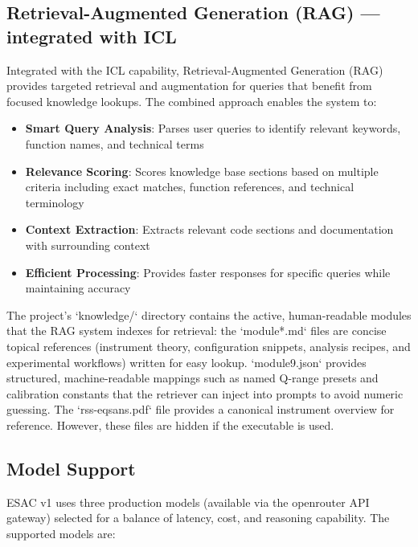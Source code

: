 \documentclass[tm]{ornltm} %
\begin{document}
\subsection{Retrieval-Augmented Generation (RAG) — integrated with ICL}
\label{subsec:rag_mode}

Integrated with the ICL capability, Retrieval-Augmented Generation (RAG) provides targeted retrieval and augmentation for queries that benefit from focused knowledge lookups. The combined approach enables the system to:

\begin{itemize}
  \item \textbf{Smart Query Analysis}: Parses user queries to identify relevant keywords, function names, and technical terms
  \item \textbf{Relevance Scoring}: Scores knowledge base sections based on multiple criteria including exact matches, function references, and technical terminology
  \item \textbf{Context Extraction}: Extracts relevant code sections and documentation with surrounding context
  \item \textbf{Efficient Processing}: Provides faster responses for specific queries while maintaining accuracy
\end{itemize}

The project's `knowledge/` directory contains the active, human-readable modules that the RAG system indexes for retrieval: the `module*.md` files are concise topical references (instrument theory, configuration snippets, analysis recipes, and experimental workflows) written for easy lookup. `module9.json` provides structured, machine-readable mappings such as named Q-range presets and calibration constants that the retriever can inject into prompts to avoid numeric guessing. The `rss-eqsans.pdf` file provides a canonical instrument overview for reference. However, these files are hidden if the executable is used.


\subsection{Model Support}
\label{subsec:multi_model}

ESAC v1 uses three production models (available via the openrouter API gateway) selected for a balance of latency, cost, and reasoning capability. The supported models are:
\end{document}
